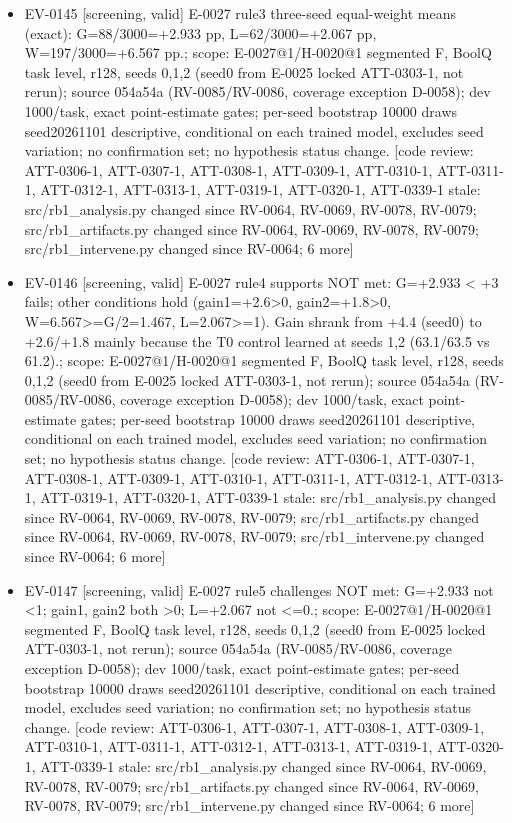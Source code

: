 \documentclass[11pt]{article}
\begin{document}
\begin{itemize}
\item EV-0145 [screening, valid] E-0027 rule3 three-seed equal-weight means (exact): G=88/3000=+2.933 pp, L=62/3000=+2.067 pp, W=197/3000=+6.567 pp.; scope: E-0027@1/H-0020@1 segmented F, BoolQ task level, r128, seeds 0,1,2 (seed0 from E-0025 locked ATT-0303-1, not rerun); source 054a54a (RV-0085/RV-0086, coverage exception D-0058); dev 1000/task, exact point-estimate gates; per-seed bootstrap 10000 draws seed20261101 descriptive, conditional on each trained model, excludes seed variation; no confirmation set; no hypothesis status change. [code review: ATT-0306-1, ATT-0307-1, ATT-0308-1, ATT-0309-1, ATT-0310-1, ATT-0311-1, ATT-0312-1, ATT-0313-1, ATT-0319-1, ATT-0320-1, ATT-0339-1 stale: src/rb1\_analysis.py changed since RV-0064, RV-0069, RV-0078, RV-0079; src/rb1\_artifacts.py changed since RV-0064, RV-0069, RV-0078, RV-0079; src/rb1\_intervene.py changed since RV-0064; 6 more]
\item EV-0146 [screening, valid] E-0027 rule4 supports NOT met: G=+2.933 \textless{} +3 fails; other conditions hold (gain1=+2.6\textgreater{}0, gain2=+1.8\textgreater{}0, W=6.567\textgreater{}=G/2=1.467, L=2.067\textgreater{}=1). Gain shrank from +4.4 (seed0) to +2.6/+1.8 mainly because the T0 control learned at seeds 1,2 (63.1/63.5 vs 61.2).; scope: E-0027@1/H-0020@1 segmented F, BoolQ task level, r128, seeds 0,1,2 (seed0 from E-0025 locked ATT-0303-1, not rerun); source 054a54a (RV-0085/RV-0086, coverage exception D-0058); dev 1000/task, exact point-estimate gates; per-seed bootstrap 10000 draws seed20261101 descriptive, conditional on each trained model, excludes seed variation; no confirmation set; no hypothesis status change. [code review: ATT-0306-1, ATT-0307-1, ATT-0308-1, ATT-0309-1, ATT-0310-1, ATT-0311-1, ATT-0312-1, ATT-0313-1, ATT-0319-1, ATT-0320-1, ATT-0339-1 stale: src/rb1\_analysis.py changed since RV-0064, RV-0069, RV-0078, RV-0079; src/rb1\_artifacts.py changed since RV-0064, RV-0069, RV-0078, RV-0079; src/rb1\_intervene.py changed since RV-0064; 6 more]
\item EV-0147 [screening, valid] E-0027 rule5 challenges NOT met: G=+2.933 not \textless{}1; gain1, gain2 both \textgreater{}0; L=+2.067 not \textless{}=0.; scope: E-0027@1/H-0020@1 segmented F, BoolQ task level, r128, seeds 0,1,2 (seed0 from E-0025 locked ATT-0303-1, not rerun); source 054a54a (RV-0085/RV-0086, coverage exception D-0058); dev 1000/task, exact point-estimate gates; per-seed bootstrap 10000 draws seed20261101 descriptive, conditional on each trained model, excludes seed variation; no confirmation set; no hypothesis status change. [code review: ATT-0306-1, ATT-0307-1, ATT-0308-1, ATT-0309-1, ATT-0310-1, ATT-0311-1, ATT-0312-1, ATT-0313-1, ATT-0319-1, ATT-0320-1, ATT-0339-1 stale: src/rb1\_analysis.py changed since RV-0064, RV-0069, RV-0078, RV-0079; src/rb1\_artifacts.py changed since RV-0064, RV-0069, RV-0078, RV-0079; src/rb1\_intervene.py changed since RV-0064; 6 more]

\end{itemize}
\end{document}
